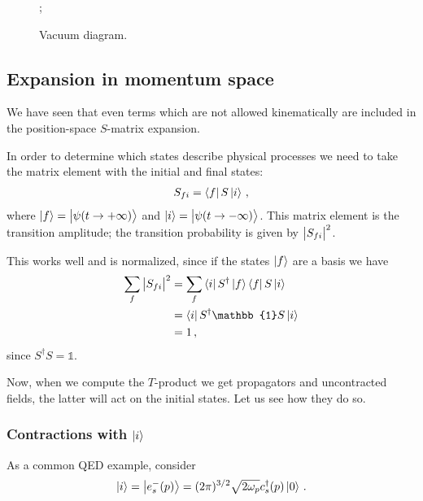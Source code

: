 \documentclass[main.tex]{subfiles}
\begin{document}
\begin{figure}[ht]
\centering
{};
\caption{Vacuum diagram.}
\label{fig:vacuum-QED}
\end{figure}


\subsection{Expansion in momentum space}

We have seen that even terms which are not allowed kinematically are included in the position-space \(S\)-matrix expansion. 

In order to determine which states describe physical processes we need to take the matrix element with the initial and final states: 
%
\begin{align}
S_{fi} = \bra{f} S \ket{i}
\,,
\end{align}
%
where \(\ket{f} = \ket{\psi (t \to + \infty )}\) and \(\ket{i} = \ket{\psi (t \to - \infty )}\).
This matrix element is the transition amplitude; the transition probability is given by \(\abs{S_{fi}}^2\). 

This works well and is normalized, since if the states \(\ket{f}\) are a basis we have 
%
\begin{align}
\sum _{f} \abs{S_{fi}}^2
&= \sum_f \bra{i} S ^\dag \ket{f}\bra{f} S \ket{i}  \\
&= \bra{i} S ^\dag \mathbb{1} S \ket{i}  \\
&= 1
\,,
\end{align}
%
since \(S ^\dag S  = \mathbb{1}\). 

Now, when we compute the \(T\)-product we get propagators and uncontracted fields, the latter will act on the initial states.
Let us see how they do so. 

\subsubsection{Contractions with \(\ket{i}\)}

As a common QED example, consider 
%
\begin{align}
\ket{i} = \ket{e^{-}_{s} (p)}
= (2 \pi )^{3/2}
\sqrt{2 \omega_{p}}
c_s ^\dag (p) \ket{0}
\,.
\end{align}
\end{document}
